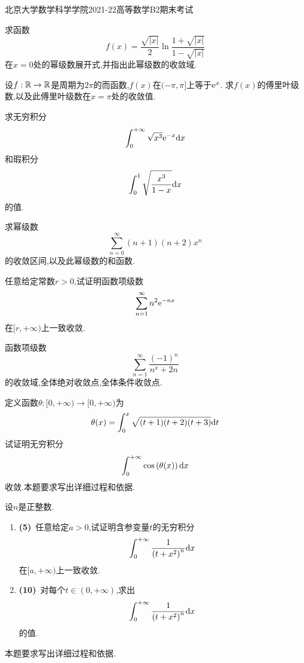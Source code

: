 \documentclass{ctexart}
\begin{document}
\pagestyle{empty}
\begin{center}\Large
    北京大学数学科学学院2021-22高等数学B2期末考试
\end{center}
\begin{problem}[1.(10\songti{分})]
    求函数
    \[f(x)=\dfrac{\sqrt{|x|}}{2}\ln\dfrac{1+\sqrt{|x|}}{1-\sqrt{|x|}}\]
    在$x=0$处的幂级数展开式,并指出此幂级数的收敛域.

\end{problem}

\begin{problem}[2.(15\songti{分})]
    设$f:\mathbb{R}\to\mathbb{R}$是周期为$2\pi$的而函数,$f(x)$在$(-\pi,\pi]$上等于$\mathrm{e}^x$.%
    求$f(x)$的傅里叶级数,以及此傅里叶级数在$x=\pi$处的收敛值.

\end{problem}

\begin{problem}[3.(10\songti{分})]
    求无穷积分
    \[\int_0^{+\infty}\sqrt{x^3}\mathrm{e}^{-x}\mathrm{d} x\]
    和瑕积分
    \[\int_0^1\sqrt{\dfrac{x^3}{1-x}}\mathrm{d} x\]
    的值.

\end{problem}

\begin{problem}[4.(10\songti{分})]
    求幂级数
    \[\sum_{n=0}^{\infty}(n+1)(n+2)x^n\]
    的收敛区间,以及此幂级数的和函数.    

\end{problem}

\begin{problem}[5.(10\songti{分})]
    任意给定常数$r>0$,试证明函数项级数
    \[\sum_{n=1}^\infty n^2\mathrm{e}^{-nx}\]
    在$[r,+\infty)$上一致收敛.
\end{problem}

\begin{problem}[6.(15\songti{分})]
    函数项级数
    \[\sum_{n=1}^\infty\dfrac{(-1)^n}{n^x+2n}\]
    的收敛域,全体绝对收敛点,全体条件收敛点.
\end{problem}

\begin{problem}[7.(15\songti{分})]
    定义函数$\theta:[0,+\infty)\to[0,+\infty)$为
    \[\theta(x)=\int_0^x\sqrt{(t+1)(t+2)(t+3)}\mathrm{d} t\]
    试证明无穷积分
    \[\int_0^{+\infty}\cos\left(\theta(x)\right)\mathrm{d} x\]
    收敛.本题要求写出详细过程和依据.

\end{problem}

\begin{problem}[8.(15\songti{分})]
    设$n$是正整数.
    \begin{enumerate}[label=\tbf{(\arabic*)},topsep=0pt,parsep=0pt,itemsep=0pt,partopsep=0pt]
        \item \textbf{(5)}\ 任意给定$a>0$,试证明含参变量$t$的无穷积分
            \[\int_0^{+\infty}\dfrac{1}{\left(t+x^2\right)^n}\mathrm{d} x\]
            在$[a,+\infty)$上一致收敛.
        \item \textbf{(10)}\ 对每个$t\in(0,+\infty)$,求出
            \[\int_0^{+\infty}\dfrac{1}{\left(t+x^2\right)^n}\mathrm{d} x\]
            的值.
    \end{enumerate}
    本题要求写出详细过程和依据.
\end{problem}
\end{document}
